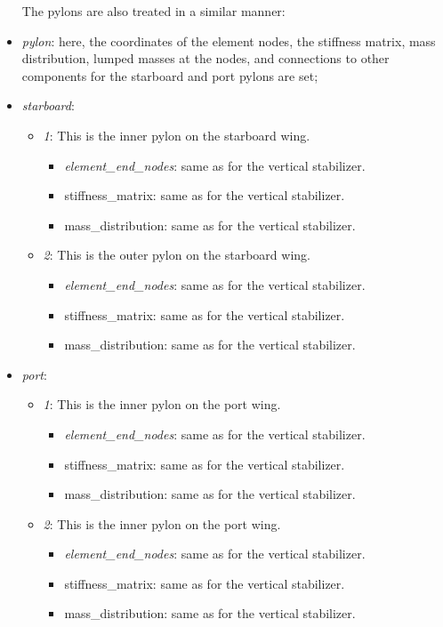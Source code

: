 \documentclass[report]{nrel}
\begin{document}
\begin{itemize}
The pylons are also treated in a similar manner:
	\item \emph{pylon}: here, the coordinates of the element nodes, the stiffness matrix, mass distribution, lumped masses at the nodes, and connections to other components for the starboard and port pylons are set; 
		\item \emph{starboard}:
		\begin{itemize}
			\item \emph{1}:	This is the inner pylon on the starboard wing.
			\begin{itemize}
				\item \emph{element\_end\_nodes}: same as for the vertical stabilizer.
				\item {stiffness\_matrix}: same as for the vertical stabilizer.
				\item {mass\_distribution}: same as for the vertical stabilizer.
			\end{itemize}
			\item \emph{2}:	This is the outer pylon on the starboard wing.
			\begin{itemize}
				\item \emph{element\_end\_nodes}: same as for the vertical stabilizer.
				\item {stiffness\_matrix}: same as for the vertical stabilizer.
				\item {mass\_distribution}: same as for the vertical stabilizer.
			\end{itemize}
		\end{itemize}
		\item \emph{port}:
		\begin{itemize}
			\item \emph{1}:	This is the inner pylon on the port wing.
			\begin{itemize}
				\item \emph{element\_end\_nodes}: same as for the vertical stabilizer.
				\item {stiffness\_matrix}: same as for the vertical stabilizer.
				\item {mass\_distribution}: same as for the vertical stabilizer.
			\end{itemize}
			\item \emph{2}:	This is the inner pylon on the port wing.
			\begin{itemize}
				\item \emph{element\_end\_nodes}: same as for the vertical stabilizer.
				\item {stiffness\_matrix}: same as for the vertical stabilizer.
				\item {mass\_distribution}: same as for the vertical stabilizer.
			\end{itemize}
		\end{itemize}


\end{itemize}
\end{document}
